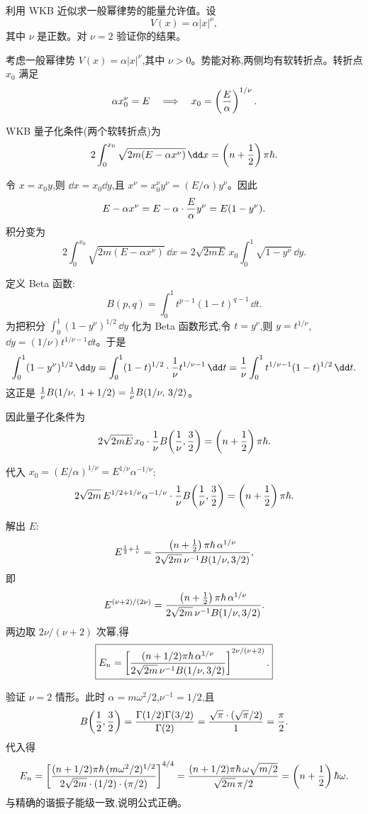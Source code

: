 \begin{question}
利用 WKB 近似求一般幂律势的能量允许值。设
\[
V(x)=\alpha |x|^\nu,
\]
其中 $\nu$ 是正数。对 $\nu=2$ 验证你的结果。
\begin{solution}
考虑一般幂律势 $V(x)=\alpha|x|^\nu$,其中 $\nu>0$。势能对称,两侧均有软转折点。转折点 $x_0$ 满足
\[
\alpha x_0^\nu=E\quad\Longrightarrow\quad x_0=\left({E\over\alpha}\right)^{1/\nu}.
\]

WKB 量子化条件(两个软转折点)为
\[
2\int_0^{x_0}\sqrt{2m(E-\alpha x^\nu)}\,\dd x
=\left(n+{1\over2}\right)\pi\hbar.
\]

令 $x=x_0 y$,则 $\dd x=x_0\dd y$,且 $x^\nu=x_0^\nu y^\nu=(E/\alpha)y^\nu$。因此
\[
E-\alpha x^\nu=E-\alpha\cdot{E\over\alpha}y^\nu=E(1-y^\nu).
\]
积分变为
\[
2\int_0^{x_0}\sqrt{2m(E-\alpha x^\nu)}\,\dd x
=2\sqrt{2mE}\,x_0\int_0^1\sqrt{1-y^\nu}\,\dd y.
\]

定义 Beta 函数:
\[
B(p,q)=\int_0^1 t^{p-1}(1-t)^{q-1}\,\dd t.
\]
为把积分 $\int_0^1(1-y^\nu)^{1/2}\,\dd y$ 化为 Beta 函数形式,令 $t=y^\nu$,则 $y=t^{1/\nu}$,$\dd y=(1/\nu)t^{1/\nu-1}\dd t$。于是
\[
\int_0^1(1-y^\nu)^{1/2}\,\dd y
=\int_0^1(1-t)^{1/2}\cdot{1\over\nu}t^{1/\nu-1}\,\dd t
={1\over\nu}\int_0^1 t^{1/\nu-1}(1-t)^{1/2}\,\dd t.
\]
这正是 ${1\over\nu}B(1/\nu,\;1+1/2)={1\over\nu}B(1/\nu,\,3/2)$。

因此量子化条件为
\[
2\sqrt{2mE}\,x_0\cdot{1\over\nu}B\!\left({1\over\nu},{3\over2}\right)
=\left(n+{1\over2}\right)\pi\hbar.
\]

代入 $x_0=(E/\alpha)^{1/\nu}=E^{1/\nu}\alpha^{-1/\nu}$:
\[
2\sqrt{2m}\,E^{1/2+1/\nu}\alpha^{-1/\nu}
\cdot{1\over\nu}B\!\left({1\over\nu},{3\over2}\right)
=\left(n+{1\over2}\right)\pi\hbar.
\]

解出 $E$:
\[
E^{{1\over2}+{1\over\nu}}
={\left(n+{1\over2}\right)\pi\hbar\,\alpha^{1/\nu}\over
2\sqrt{2m}\,\nu^{-1}B(1/\nu,3/2)},
\]
即
\[
E^{(\nu+2)/(2\nu)}
={\left(n+{1\over2}\right)\pi\hbar\,\alpha^{1/\nu}\over
2\sqrt{2m}\,\nu^{-1}B(1/\nu,3/2)}.
\]
两边取 $2\nu/(\nu+2)$ 次幂,得
\[
\boxed{E_n=\left[{(n+1/2)\pi\hbar\,\alpha^{1/\nu}\over
2\sqrt{2m}\,\nu^{-1}B(1/\nu,3/2)}\right]^{2\nu/(\nu+2)}.}
\]

验证 $\nu=2$ 情形。此时 $\alpha=m\omega^2/2$,$\nu^{-1}=1/2$,且
\[
B\!\left({1\over2},{3\over2}\right)
={\Gamma(1/2)\Gamma(3/2)\over\Gamma(2)}
={\sqrt\pi\cdot(\sqrt\pi/2)\over1}={\pi\over2}.
\]
代入得
\[
E_n=\left[{(n+1/2)\pi\hbar\,(m\omega^2/2)^{1/2}\over
2\sqrt{2m}\cdot(1/2)\cdot(\pi/2)}\right]^{4/4}
={(n+1/2)\pi\hbar\,\omega\sqrt{m/2}\over
\sqrt{2m}\,\pi/2}
=\left(n+{1\over2}\right)\hbar\omega.
\]
与精确的谐振子能级一致,说明公式正确。
\end{solution}
\end{question}


